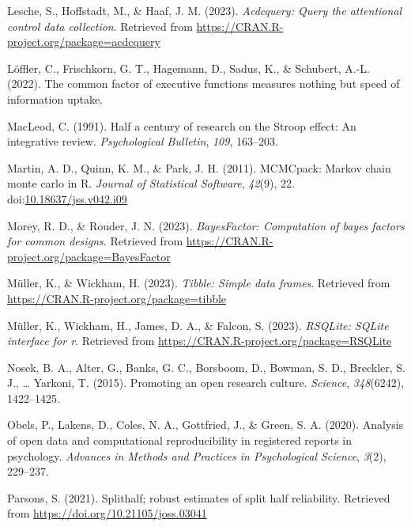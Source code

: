 \documentclass[
  man,floatsintext]{apa6}
\newlength{\cslhangindent}
\newlength{\cslentryspacingunit} %
\newenvironment{CSLReferences}[2] %
 {%
  \setlength{\parindent}{0pt}
  \ifodd #1
  \let\oldpar\par
  \def\par{\hangindent=\cslhangindent\oldpar}
  \fi
  \setlength{\parskip}{#2\cslentryspacingunit}
 }%
 {}
\begin{document}
\begin{CSLReferences}{1}{0}
\leavevmode{}%
Lesche, S., Hoffstadt, M., \& Haaf, J. M. (2023). \emph{Acdcquery: Query the attentional control data collection}. Retrieved from \url{https://CRAN.R-project.org/package=acdcquery}

\leavevmode{}%
Löffler, C., Frischkorn, G. T., Hagemann, D., Sadus, K., \& Schubert, A.-L. (2022). The common factor of executive functions measures nothing but speed of information uptake.

\leavevmode{}%
MacLeod, C. (1991). Half a century of research on the {S}troop effect: {A}n integrative review. \emph{Psychological Bulletin}, \emph{109}, 163--203.

\leavevmode{}%
Martin, A. D., Quinn, K. M., \& Park, J. H. (2011). {MCMCpack}: Markov chain monte carlo in {R}. \emph{Journal of Statistical Software}, \emph{42}(9), 22. doi:\href{https://doi.org/10.18637/jss.v042.i09}{10.18637/jss.v042.i09}

\leavevmode{}%
Morey, R. D., \& Rouder, J. N. (2023). \emph{BayesFactor: Computation of bayes factors for common designs}. Retrieved from \url{https://CRAN.R-project.org/package=BayesFactor}

\leavevmode{}%
Müller, K., \& Wickham, H. (2023). \emph{Tibble: Simple data frames}. Retrieved from \url{https://CRAN.R-project.org/package=tibble}

\leavevmode{}%
Müller, K., Wickham, H., James, D. A., \& Falcon, S. (2023). \emph{RSQLite: SQLite interface for r}. Retrieved from \url{https://CRAN.R-project.org/package=RSQLite}

\leavevmode{}%
Nosek, B. A., Alter, G., Banks, G. C., Borsboom, D., Bowman, S. D., Breckler, S. J., \ldots{} Yarkoni, T. (2015). Promoting an open research culture. \emph{Science}, \emph{348}(6242), 1422--1425.

\leavevmode{}%
Obels, P., Lakens, D., Coles, N. A., Gottfried, J., \& Green, S. A. (2020). Analysis of open data and computational reproducibility in registered reports in psychology. \emph{Advances in Methods and Practices in Psychological Science}, \emph{3}(2), 229--237.

\leavevmode{}%
Parsons, S. (2021). Splithalf; robust estimates of split half reliability. Retrieved from \url{https://doi.org/10.21105/joss.03041}


\end{CSLReferences}
\end{document}
